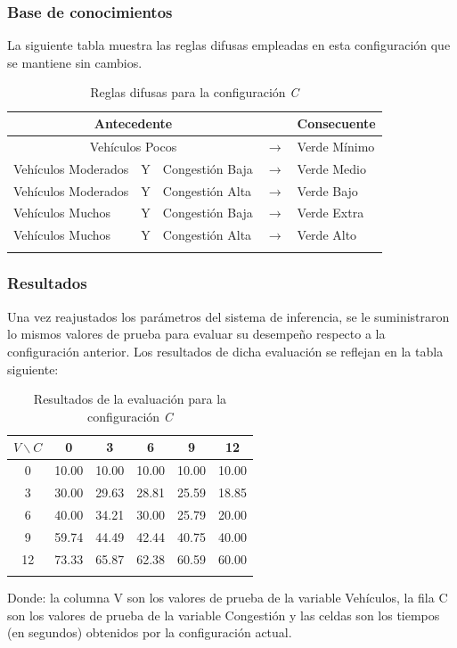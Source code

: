 \subsubsection{Base de conocimientos}
La siguiente tabla muestra las reglas difusas empleadas en esta configuración que se mantiene sin cambios.
\begin{longtable}[c]{lclcl} \toprule
	\multicolumn{3}{c}{Antecedente} & & Consecuente \\ \midrule
	\multicolumn{3}{c}{Vehículos Pocos} & $\rightarrow$ & Verde Mínimo \\
	Vehículos Moderados & Y & Congestión Baja& $\rightarrow$ & Verde Medio \\
	Vehículos Moderados & Y & Congestión Alta& $\rightarrow$ & Verde Bajo \\
	Vehículos Muchos &Y& Congestión Baja& $\rightarrow$ & Verde Extra \\
	Vehículos Muchos &Y& Congestión Alta& $\rightarrow$ & Verde Alto \\ \hline
	\caption{Reglas difusas para la configuración \textit{C}}
\end{longtable}

\pagebreak
\subsubsection{Resultados}
Una vez reajustados los parámetros del sistema de inferencia, se le suministraron lo mismos valores de prueba para evaluar su desempeño respecto a la configuración anterior. Los resultados de dicha evaluación se reflejan en la tabla siguiente:

\begin{longtable}[c]{cccccc} \toprule
	$V \backslash C$ &  0 & 3 & 6 & 9 & 12 \\ \midrule
	0 & 10.00 & 10.00 & 10.00 & 10.00 & 10.00 \\
	3 & 30.00 & 29.63 & 28.81 & 25.59 & 18.85 \\
	6 & 40.00 & 34.21 & 30.00 & 25.79 & 20.00 \\
	9 & 59.74 & 44.49 & 42.44 & 40.75 & 40.00 \\
	12& 73.33 & 65.87 & 62.38 & 60.59 & 60.00 \\
	\caption{Resultados de la evaluación para la configuración \textit{C}}
\end{longtable}

Donde: la columna V son los valores de prueba de la variable Vehículos, la fila C son los valores de  prueba de la variable Congestión y las celdas son los tiempos (en segundos) obtenidos por la configuración actual.

